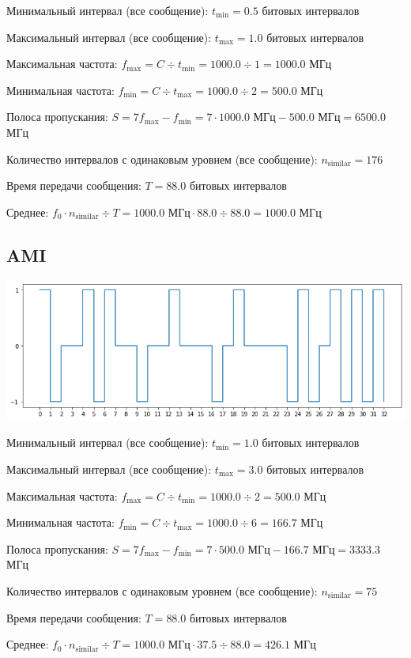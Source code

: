 Минимальный интервал (все сообщение): $t_\mathrm{min}=0.5$ битовых интервалов

Максимальный интервал (все сообщение): $t_\mathrm{max}=1.0$ битовых интервалов

Максимальная частота: $f_\mathrm{max}=C\div t_\mathrm{min}=1000.0\div 1=1000.0$ МГц

Минимальная частота: $f_\mathrm{min}=C\div t_\mathrm{max}=1000.0\div 2=500.0$ МГц

Полоса пропускания: $S=7f_\mathrm{max}-f_\mathrm{min} = 7\cdot 1000.0\text{ МГц}-500.0\text{ МГц}=6500.0$ МГц

Количество интервалов с одинаковым уровнем (все сообщение): $n_\mathrm{similar}=176$

Время передачи сообщения: $T=88.0$ битовых интервалов

Среднее: $f_0\cdot n_\mathrm{similar}\div T=1000.0\text{ МГц}\cdot 88.0\div 88.0=1000.0$ МГц

\subsection{AMI}
\includegraphics[width=\textwidth]{3ami}

Минимальный интервал (все сообщение): $t_\mathrm{min}=1.0$ битовых интервалов

Максимальный интервал (все сообщение): $t_\mathrm{max}=3.0$ битовых интервалов

Максимальная частота: $f_\mathrm{max}=C\div t_\mathrm{min}=1000.0\div 2=500.0$ МГц

Минимальная частота: $f_\mathrm{min}=C\div t_\mathrm{max}=1000.0\div 6=166.7$ МГц

Полоса пропускания: $S=7f_\mathrm{max}-f_\mathrm{min} = 7\cdot 500.0\text{ МГц}-166.7\text{ МГц}=3333.3$ МГц

Количество интервалов с одинаковым уровнем (все сообщение): $n_\mathrm{similar}=75$

Время передачи сообщения: $T=88.0$ битовых интервалов

Среднее: $f_0\cdot n_\mathrm{similar}\div T=1000.0\text{ МГц}\cdot 37.5\div 88.0=426.1$ МГц

